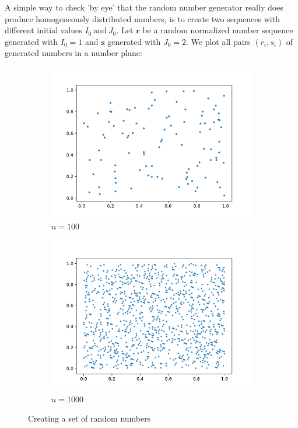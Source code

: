 \documentclass{article}
\begin{document}
A simple way to check 'by eye' that the random number generator really does
produce homogeneously distributed numbers, is to create two sequences with
different initial values \( I_0 \ \text{and} \ J_0 \). 
Let \( \mathbf{r} \) be a random normalized number sequence generated with
\( I_0 = 1 \) and \( \mathbf{s} \) generated with \( J_0 = 2 \).
We plot all pairs \( (r_i, s_i) \) of generated numbers in a number plane:
\begin{figure}[H]
    \centering
    \begin{subfigure}[b]{0.49\linewidth}
	\centering
	\includegraphics[width=\textwidth]{Fig1-1.pdf} 
	\caption{$n=100$} 
    \end{subfigure}
    \begin{subfigure}[b]{0.49\linewidth}
	\centering
	\includegraphics[width=\textwidth]{Fig1-2.pdf} 
	\caption{$n=1000$} 
    \end{subfigure}
    \caption{Creating a set of random numbers}
\end{figure}
\end{document}
